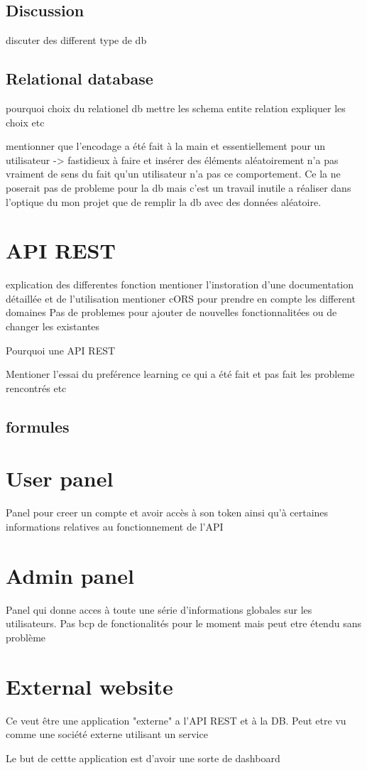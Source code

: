\subsection{Discussion}
discuter des different type de db
\subsection{Relational database}
pourquoi choix du relationel db
mettre les schema entite relation expliquer les choix etc

 mentionner que l'encodage a été fait à la main et essentiellement pour un utilisateur -> fastidieux à faire et insérer des éléments aléatoirement n'a pas vraiment de sens du fait qu'un utilisateur n'a pas ce comportement. Ce la ne poserait pas de probleme pour la db mais c'est un travail inutile a réaliser dans l'optique du mon projet que de remplir la db avec des données aléatoire.
\section{API REST}
explication des differentes fonction
 mentioner l'instoration d'une documentation détaillée et de l'utilisation 
 mentioner cORS pour prendre en compte les different domaines
 Pas de problemes pour ajouter de nouvelles fonctionnalitées ou de changer les existantes
 
 Pourquoi une API REST
 
 Mentioner l'essai du preférence learning ce qui a été fait et pas fait les probleme rencontrés etc
 \subsection{formules}
 

\section{User panel}
Panel pour creer un compte et avoir accès à son token ainsi qu'à certaines informations relatives au fonctionnement de l'API

\section{Admin panel}
Panel qui donne acces à toute une série d'informations globales sur les utilisateurs. Pas bcp de fonctionalités pour le moment mais peut etre étendu sans problème

\section{External website}
Ce veut être une application "externe" a l'API REST et à la DB. Peut etre vu comme une société externe utilisant un service

Le but de cettte application est d'avoir une sorte de dashboard
